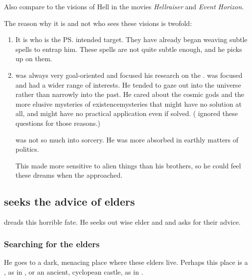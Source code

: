 Also compare to the visions of Hell in the movies \emph{Hellraiser} and \emph{Event Horizon}. 

The reason why it is \Ishnaruchaefir{} and not \Secherdamon{} who sees these visions is twofold:

\begin{enumerate}
  \item 
    It is \Ishnaruchaefir{} who is the \ps{\resphain} intended target.  
    They have already began weaving subtle spells to entrap him. 
    These spells are not quite subtle enough, and he picks up on them. 
  \item 
    \Secherdamon{} was always very goal-oriented and focused his research on the \xss. 
    \Ishnaruchaefir{} was focused and had a wider range of interests. 
    He tended to gaze out into the universe rather than narrowly into the \psp{\dragons}{} past. 
    He cared about the cosmic gods and the more elusive mysteries of existence\dash mysteries that might have no solution at all, and might have no practical application even if solved. 
    (\Secherdamon{} ignored these questions for those reasons.)
    
    \Nexagglachel{} was not so much into sorcery. 
    He was more absorbed in earthly matters of politics. 
    
    This made \Ishnaruchaefir{} more sensitive to alien things than his brothers, so he could feel these dreams when the \resphain{} approached. 
\end{enumerate}








\subsection{\Ishnaruchaefir seeks the advice of elders}
\Ishnaruchaefir{} dreads this horrible fate. 
He seeks out wise elder \ophidians{} and \nagalords{} and asks for their advice. 



\subsubsection{Searching for the elders}
He goes to a dark, menacing place where these elders live. 
Perhaps this place is a , as in , or an ancient, cyclopean castle, as in .


